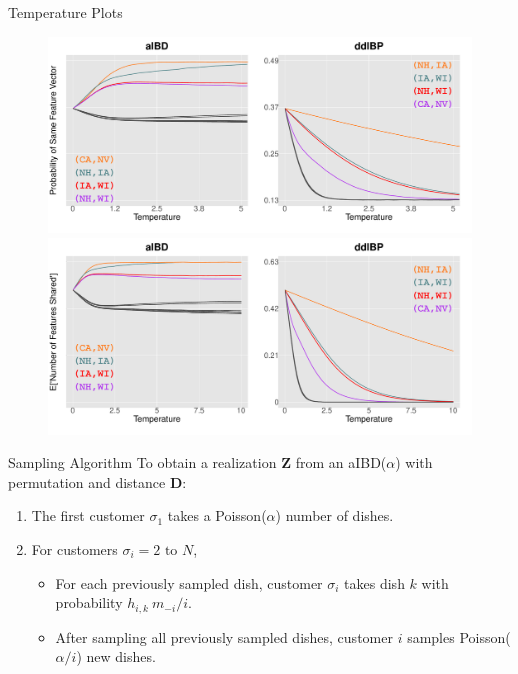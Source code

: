 \documentclass[serif,mathserif,final]{beamer}
\begin{document}
\begin{frame}{}
\begin{columns}[t]
\begin{column}{0.4\linewidth}
\begin{block}{Temperature Plots}
        \begin{figure}[htb]
          \centering
          \href{http://luiarthur.github.io/posts/ibp/may/26}{\includegraphics[width=.99\columnwidth,trim={0 0.7cm 0 0.3cm},clip]{temperatureArrest}}
          \\
          \includegraphics[width=.99\columnwidth,trim={0 0.7cm 0 0.3cm},clip]{sharedTemper}
        \end{figure}
      \end{block}

 
\vspace{1em}

       \begin{block}{Sampling Algorithm}
        To obtain a realization $\bm Z$ from an aIBD($\alpha$) with permutation
        \bm{$\sigma$} and distance $\bm D$: 
        \vspace{.5em}
        \begin{enumerate}
          \item The first customer $\sigma_1$ takes a Poisson($\alpha$) number of dishes.
          \item For customers $\sigma_i = 2\text{ to } N$,
          \begin{itemize}
            \item For each previously sampled dish,
              customer $\sigma_i$ takes dish $k$ with probability
              $h_{i,k}~m_{-i}/i$.
            \item After sampling all previously sampled dishes, customer
              $i$ samples Poisson($\alpha/i$) new dishes.
          \end{itemize}
        \end{enumerate}
      \end{block}







\end{column}
\end{columns}
\end{frame}
\end{document}
